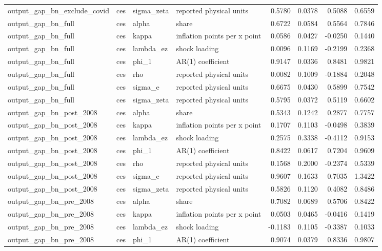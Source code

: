 \begin{tabular}{llllrrrr}
output\_gap\_bn\_exclude\_covid & ces & sigma\_zeta & reported physical units & 0.5780 & 0.0378 & 0.5088 & 0.6559 \\
output\_gap\_bn\_full & ces & alpha & share & 0.6722 & 0.0584 & 0.5564 & 0.7846 \\
output\_gap\_bn\_full & ces & kappa & inflation points per x point & 0.0586 & 0.0427 & -0.0250 & 0.1440 \\
output\_gap\_bn\_full & ces & lambda\_ez & shock loading & 0.0096 & 0.1169 & -0.2199 & 0.2368 \\
output\_gap\_bn\_full & ces & phi\_1 & AR(1) coefficient & 0.9147 & 0.0336 & 0.8481 & 0.9821 \\
output\_gap\_bn\_full & ces & rho & reported physical units & 0.0082 & 0.1009 & -0.1884 & 0.2048 \\
output\_gap\_bn\_full & ces & sigma\_e & reported physical units & 0.6675 & 0.0430 & 0.5899 & 0.7542 \\
output\_gap\_bn\_full & ces & sigma\_zeta & reported physical units & 0.5795 & 0.0372 & 0.5119 & 0.6602 \\
output\_gap\_bn\_post\_2008 & ces & alpha & share & 0.5343 & 0.1242 & 0.2877 & 0.7757 \\
output\_gap\_bn\_post\_2008 & ces & kappa & inflation points per x point & 0.1707 & 0.1103 & -0.0498 & 0.3839 \\
output\_gap\_bn\_post\_2008 & ces & lambda\_ez & shock loading & 0.2575 & 0.3338 & -0.4112 & 0.9153 \\
output\_gap\_bn\_post\_2008 & ces & phi\_1 & AR(1) coefficient & 0.8422 & 0.0617 & 0.7204 & 0.9609 \\
output\_gap\_bn\_post\_2008 & ces & rho & reported physical units & 0.1568 & 0.2000 & -0.2374 & 0.5339 \\
output\_gap\_bn\_post\_2008 & ces & sigma\_e & reported physical units & 0.9607 & 0.1633 & 0.7035 & 1.3422 \\
output\_gap\_bn\_post\_2008 & ces & sigma\_zeta & reported physical units & 0.5826 & 0.1120 & 0.4082 & 0.8486 \\
output\_gap\_bn\_pre\_2008 & ces & alpha & share & 0.7082 & 0.0689 & 0.5706 & 0.8422 \\
output\_gap\_bn\_pre\_2008 & ces & kappa & inflation points per x point & 0.0503 & 0.0465 & -0.0416 & 0.1419 \\
output\_gap\_bn\_pre\_2008 & ces & lambda\_ez & shock loading & -0.1183 & 0.1105 & -0.3387 & 0.1033 \\
output\_gap\_bn\_pre\_2008 & ces & phi\_1 & AR(1) coefficient & 0.9074 & 0.0379 & 0.8336 & 0.9807 \\

\end{tabular}
